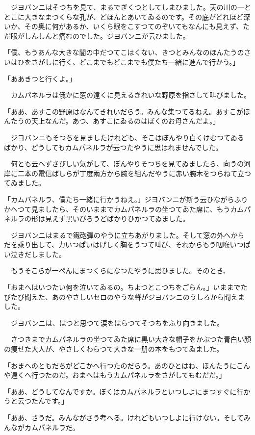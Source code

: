 \documentclass[tate,paper=b6j,jafontsize=9pt]{jlreq}
\begin{document}
　ジヨバンニはそつちを見て、まるでぎくつとしてしまひました。天の川の一ととこに大きなまつくらな孔が、どほんとあいてゐるのです。その底がどれほど深いか、その奧に何があるか、いくら眼をこすつてのぞいてもなんにも見えず、ただ眼がしんしんと痛むのでした。ジヨバンニが云ひました。

「僕、もうあんな大きな闇の中だつてこはくない、きつとみんなのほんたうのさいはひをさがしに行く、どこまでもどこまでも僕たち一緒に進んで行かう。」

「ああきつと行くよ。」

　カムパネルラは俄かに窓の遠くに見えるきれいな野原を指さして叫びました。

「ああ、あすこの野原はなんてきれいだらう。みんな集つてるねえ。あすこがほんたうの天上なんだ。あつ、あすこにゐるのはぼくのお母さんだよ。」

　ジヨバンニもそつちを見ましたけれども、そこはぼんやり白くけむつてゐるばかり、どうしてもカムパネルラが云つたやうに思はれませんでした。

　何とも云へずさびしい氣がして、ぼんやりそつちを見てゐましたら、向うの河岸に二本の電信ばしらが丁度兩方から腕を組んだやうに赤い腕木をつらねて立つてゐました。

「カムパネルラ、僕たち一緒に行かうねえ。」ジヨバンニが斯う云ひながらふりかへつて見ましたら、そのいままでカムパネルラの坐つてゐた席に、もうカムパネルラの形は見えず黒いびろうどばかりひかつてゐました。

　ジヨバンニはまるで鐵砲彈のやうに立ちあがりました。そして窓の外へからだを乘り出して、力いつぱいはげしく胸をうつて叫び、それからもう咽喉いつぱい泣きだしました。

　もうそこらが一ぺんにまつくらになつたやうに思ひました。そのとき、

「おまへはいつたい何を泣いてゐるの。ちよつとこつちをごらん。」いままでたびたび聞えた、あのやさしいセロのやうな聲がジヨバンニのうしろから聞えました。

　ジヨバンニは、はつと思つて涙をはらつてそつちをふり向きました。

　さつきまでカムパネルラの坐つてゐた席に黒い大きな帽子をかぶつた青白い顏の痩せた大人が、やさしくわらつて大きな一册の本をもつてゐました。

「おまへのともだちがどこかへ行つたのだらう。あのひとはね、ほんたうにこんや遠くへ行つたのだ。おまへはもうカムパネルラをさがしてもむだだ。」

「ああ、どうしてなんですか。ぼくはカムパネルラといつしよにまつすぐに行かうと云つたんです。」

「ああ、さうだ。みんながさう考へる。けれどもいつしよに行けない。そしてみんながカムパネルラだ。
\end{document}
